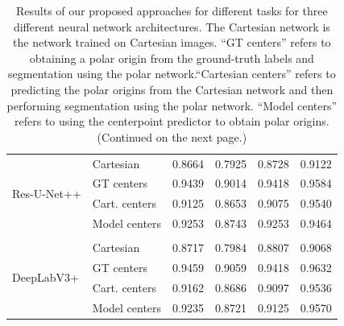 \begin{table}
\begin{tabularx}{\textwidth}{X X c c c c}
 \multirow{4}{7em}{{Res-U-Net++}}
& Cartesian & 0.8664 & 0.7925 & 0.8728 & 0.9122 \\
& GT centers & 0.9439 & 0.9014 & 0.9418 & 0.9584 \\
& Cart. centers & 0.9125 & 0.8653 & 0.9075 & 0.9540 \\
& Model centers & 0.9253 & 0.8743 & 0.9253 & 0.9464 \\ [1ex]
\hline \\ [-1.5ex]

 \multirow{4}{7em}{{DeepLabV3+}}
& Cartesian & 0.8717 & 0.7984 & 0.8807 & 0.9068 \\
& GT centers & 0.9459 & 0.9059 & 0.9418 & 0.9632 \\
& Cart. centers & 0.9162 & 0.8686 & 0.9097 & 0.9536 \\
& Model centers & 0.9235 & 0.8721 & 0.9125 & 0.9570 \\ [1ex]
\end{tabularx}
\caption{Results of our proposed approaches for different tasks 
for three different neural network architectures. The Cartesian network is the network trained on Cartesian images. ``GT centers'' refers to obtaining a polar origin from the ground-truth labels and segmentation using the polar network.``Cartesian centers'' refers to predicting the polar origins from the Cartesian network and then performing segmentation using the polar network. ``Model centers'' refers to using the centerpoint predictor to obtain polar origins. (Continued on the next page.)}
\label{table:results}
\end{table}

